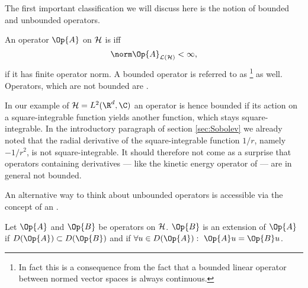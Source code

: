The first important classification we will discuss here
is the notion of bounded and unbounded operators.
\begin{defn}
	\label{defn:OpBounded}
	An operator $\Op{A}$ on $\mathcal{H}$ is  iff
	\[ \opnorm{\Op{A}} < \infty, \]
	\ie if it has finite operator norm.
	A bounded operator is referred to as %
	\footnote{In fact this is a consequence from the fact that a bounded linear operator
	between normed vector spaces is always continuous.} as well.
	Operators, which are not bounded are .
\end{defn}
In our example of $\hilbert = L^2(\R^d, \C)$ an operator is hence bounded
if its action on a square-integrable function yields another function,
which stays square-integrable.
In the introductory paragraph of section \vref{sec:Sobolev}
we already noted that the radial derivative of
the square-integrable function $1/r$, namely $-1/r^2$,
is not square-integrable.
It should therefore not come as a surprise that
operators containing derivatives
--- like the kinetic energy operator of \QM ---
are in general not bounded.

An alternative way to think about unbounded operators
is accessible via the concept of an .
\begin{defn}
	Let $\Op{A}$ and $\Op{B}$ be operators on $\mathcal{H}$.
	$\Op{B}$ is an extension of $\Op{A}$ if
	\mbox{$D(\Op{A}) \subset D(\Op{B})$}
	and if $\forall u \in D(\Op{A}): \ \Op{A}u = \Op{B}u$.
\end{defn}

